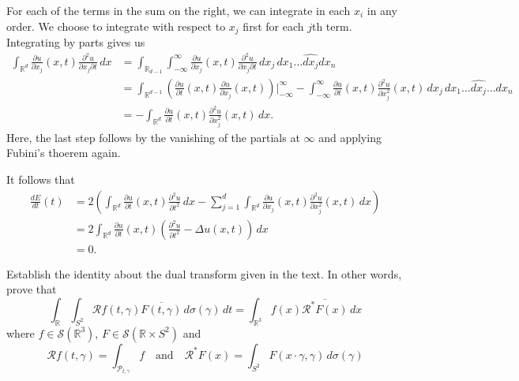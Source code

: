 \documentclass[12 pt, letterpaper]{hmcpset}
\begin{document}
\begin{solution}
	For each of the terms in the sum on the right, we can integrate in each $x_{i}$ in any order. We choose to integrate with respect to $x_{j}$ first for each $j$th term. Integrating by parts gives us
	\begin{align*}
		\int_{\mathbb{R}^{d}} \frac{\partial u}{\partial x_{j}}(x, t) \frac{\partial^{2} u}{\partial x_{j} \partial t} \, dx & = \int_{\mathbb{R}_{d - 1}} \int_{-\infty}^{\infty} \frac{\partial u}{\partial x_{j}}(x, t) \frac{\partial^{2} u}{\partial x_{j} \partial t} \, dx_{j}  \, dx_{1} \dots \widehat{dx_{j}} dx_{n} \\
																     & = \int_{\mathbb{R}^{d - 1}} \left ( \frac{\partial u}{\partial t}(x, t) \frac{\partial u}{\partial x_{j}}(x, t) \right ) \Big |_{-\infty}^{\infty} - \int_{-\infty}^{\infty} \frac{\partial u}{\partial t}(x, t) \frac{\partial^{2} u}{\partial x_{j}^{2}}(x, t) \, dx_{j}  \, dx_{1} \dots \widehat{dx_{j}} \dots dx_{n} \\
																     & = - \int_{\mathbb{R}^{d}} \frac{\partial u}{\partial t}(x, t) \frac{\partial^{2} u}{\partial x_{j}^{2}}(x, t) \, dx.
	\end{align*}
	Here, the last step follows by the vanishing of the partials at $\infty$ and applying Fubini's thoerem again.

	It follows that
	\begin{align*}
		\frac{d E}{d t}(t) & = 2 \left ( \int_{\mathbb{R}^{d}} \frac{\partial u}{\partial t}(x, t) \frac{\partial^{2} u}{\partial t^{2}} \, dx - \sum_{j = 1}^{d} \int_{\mathbb{R}^{d}} \frac{\partial u}{\partial x_{j}}(x, t) \frac{\partial^{2} u}{\partial x_{j}^{2}}(x, t) \, dx  \right ) \\
				   & = 2 \int_{\mathbb{R}^{d}} \frac{\partial u}{\partial t}(x, t) \left ( \frac{\partial^{2} u}{\partial t^{2}} - \Delta u(x, t) \right ) \, dx   \\
				   & = 0.
	\end{align*}
\end{solution}

\pagebreak

\begin{problem}[S \& S \S 6.6 \#12]
	Establish the identity about the dual transform given in the text. In other words, prove that
	\[
		\int_{\mathbb{R}} \int_{S^{2}} \mathcal{R}f(t, \gamma) \overline{F(t, \gamma)} \, d\sigma(\gamma)  \, dt = \int_{\mathbb{R}^{3}} f(x) \overline{\mathcal{R}^{*}F(x)} \, dx 
	\]
	where $f \in \mathcal{S}(\mathbb{R}^{3})$, $F \in \mathcal{S}(\mathbb{R} \times S^{2})$ and
	\[
		\mathcal{R}f(t, \gamma) = \int_{\mathcal{P}_{t, \gamma}} f \quad \text{and} \quad \mathcal{R}^{*}F(x) = \int_{S^{2}} F(x \cdot \gamma, \gamma) \, d\sigma(\gamma)
	\]
\end{problem}
\end{document}

